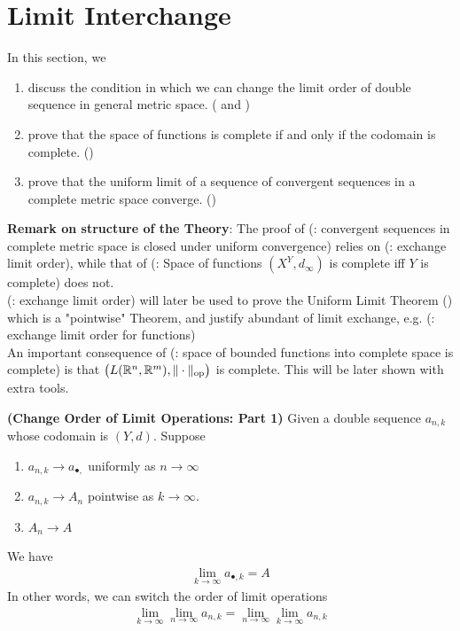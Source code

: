 \documentclass{report}
\begin{document}
\section{Limit Interchange}
\begin{mdframed}
In this section, we 
\begin{enumerate}[label=(\alph*)]
  \item discuss the condition in which we can change the limit order of double sequence in general metric space. ( and )
  \item prove that the space of functions is complete if and only if the codomain is complete. ()
  \item prove that the uniform limit of a sequence of convergent sequences in a complete metric space converge. ()
\end{enumerate}
\textbf{Remark on structure of the Theory}: The proof of  (: convergent sequences in complete metric space is closed under uniform convergence) relies on (: exchange limit order), while that of (: Space of functions $(X^Y, d_\infty)$ is complete iff $Y$ is complete) does not.\\

(: exchange limit order) will later be used to prove the Uniform Limit Theorem () which is a "pointwise" Theorem, and justify abundant of limit exchange, e.g. (: exchange limit order for functions)\\

An important consequence of (: space of bounded functions into complete space is complete) is that $\big(L(\mathbb{R}^n,\mathbb{R}^m), \| \cdot \|_{\text{op}} \big)$ is complete. This will be later shown with extra tools. 
\end{mdframed}
\begin{theorem}
\label{COLO}
\textbf{(Change Order of Limit Operations: Part 1)} Given a double sequence $a_{n,k}$ whose codomain is $(Y,d)$. Suppose
\begin{enumerate}[label=(\alph*)]
  \item $a_{n,k}\to a_{\bullet,}$ uniformly as $n\to \infty$ 
  \item $a_{n,k}\to A_n$ pointwise as  $k\to \infty$.
  \item $A_n \to A$ 
\end{enumerate}
We have  
\begin{align*}
\lim_{k\to \infty}a_{\bullet,k}=A
\end{align*}
In other words, we can switch the order of limit operations
\begin{align*}
\lim_{k\to \infty}\lim_{n\to \infty}a_{n,k}=\lim_{n\to \infty}\lim_{k\to \infty}a_{n,k}
\end{align*}
\end{theorem}
\end{document}
